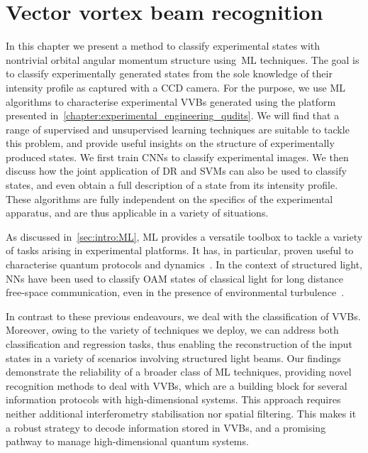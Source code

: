
\chapter{Vector vortex beam recognition}
\label{chapter:ML_VVBs}

In this chapter we present a method to classify experimental states with nontrivial orbital angular momentum structure using~\acf{ML} techniques.
The goal is to classify experimentally generated states from the sole knowledge of their intensity profile as captured with a CCD camera.
For the purpose, we use \ac{ML} algorithms to characterise experimental \acfp{VVB} generated using the platform presented in~\cref{chapter:experimental_engineering_qudits}.
We will find that a range of supervised and unsupervised learning techniques are suitable to tackle this problem, and provide useful insights on the structure of experimentally produced states.
We first train \acp{CNN} to classify experimental images.
We then discuss how the joint application of \ac{DR} and \acp{SVM} can also be used to classify states, and even obtain a full description of a state from its intensity profile.
These algorithms are fully independent on the specifics of the experimental apparatus, and are thus applicable in a variety of situations.

As discussed in~\cref{sec:intro:ML}, \ac{ML} provides a versatile toolbox to tackle a variety of tasks arising in experimental platforms. It has, in particular, proven useful to characterise quantum protocols and dynamics~\cite{carrasquilla2019reconstructing,giordani2018experimental, agresti2019pattern,lumino2018experimental,rocchetto2019experimental,butler2018machine,fischer2006predicting,melnikov2018active,wang2017experimental}.
In the context of structured light, \acp{NN} have been used to classify \ac{OAM} states of classical light for long distance free-space communication, even in the presence of environmental turbulence~\cite{krenn2014communication,krenn2016twisted,doster2017machine,park2018demultiplexing,lohani2018turbulence,li2018joint}.

In contrast to these previous endeavours, we deal with the classification of \acp{VVB}. Moreover, owing to the variety of techniques we deploy, we can address both classification and regression tasks, thus enabling the reconstruction of the input states in a variety of scenarios involving structured light beams.
Our findings demonstrate the reliability of a broader class of ML techniques, providing novel recognition methods to deal with \acp{VVB}, which are a building block for several information protocols with high-dimensional systems.
This approach requires neither additional interferometry stabilisation nor spatial filtering. This makes it a robust strategy to decode information stored in \acp{VVB}, and a promising pathway to manage high-dimensional quantum systems. 

